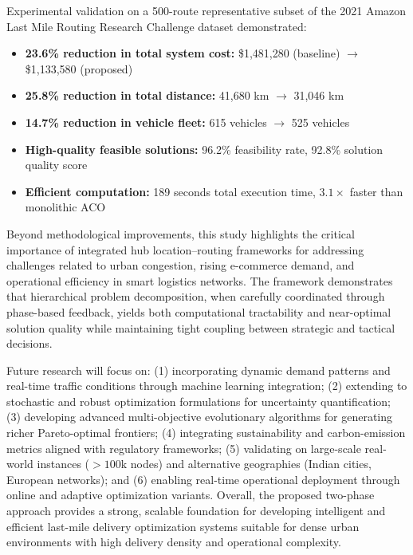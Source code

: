 \documentclass[conference]{IEEEtran}
\begin{document}
Experimental validation on a 500-route representative subset of the 2021 Amazon Last Mile Routing Research Challenge dataset demonstrated:
\begin{itemize}
    \item \textbf{23.6\% reduction in total system cost:} \$1,481,280 (baseline) $\to$ \$1,133,580 (proposed)
    \item \textbf{25.8\% reduction in total distance:} 41,680 km $\to$ 31,046 km
    \item \textbf{14.7\% reduction in vehicle fleet:} 615 vehicles $\to$ 525 vehicles
    \item \textbf{High-quality feasible solutions:} 96.2\% feasibility rate, 92.8\% solution quality score
    \item \textbf{Efficient computation:} 189 seconds total execution time, $3.1\times$ faster than monolithic ACO
\end{itemize}

Beyond methodological improvements, this study highlights the critical importance of integrated hub location–routing frameworks for addressing challenges related to urban congestion, rising e-commerce demand, and operational efficiency in smart logistics networks. The framework demonstrates that hierarchical problem decomposition, when carefully coordinated through phase-based feedback, yields both computational tractability and near-optimal solution quality while maintaining tight coupling between strategic and tactical decisions.

Future research will focus on: (1) incorporating dynamic demand patterns and real-time traffic conditions through machine learning integration; (2) extending to stochastic and robust optimization formulations for uncertainty quantification; (3) developing advanced multi-objective evolutionary algorithms for generating richer Pareto-optimal frontiers; (4) integrating sustainability and carbon-emission metrics aligned with regulatory frameworks; (5) validating on large-scale real-world instances ($>100$k nodes) and alternative geographies (Indian cities, European networks); and (6) enabling real-time operational deployment through online and adaptive optimization variants. Overall, the proposed two-phase approach provides a strong, scalable foundation for developing intelligent and efficient last-mile delivery optimization systems suitable for dense urban environments with high delivery density and operational complexity.
\end{document}
